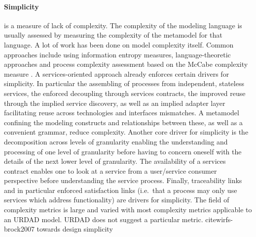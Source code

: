 \paragraph{Simplicity} is a measure of lack of complexity. The complexity of the modeling language is usually assessed by measuring the complexity of the metamodel for that language\cite{mohagheghi_evaluating_2007}. A lot of work has been done on model complexity itself. Common approaches include using information entropy measures\cite{abrahamsson_extreme_2004}, language-theoretic approaches\cite{podgorelec_estimating_2007} and process complexity assessment based on the McCabe complexity measure \cite{mccabe_complexity_1976}. A services-oriented approach already enforces certain drivers for simplicity. In particular the assembling of processes from independent, stateless services, the enforced decoupling through services contracts, the improved reuse through the implied service discovery, as well as an implied adapter layer facilitating reuse across technologies and interfaces mismatches. A metamodel confining the modeling constructs and relationships between these, as well as a convenient grammar, reduce complexity. Another core driver for simplicity is the decomposition across levels of granularity enabling the understanding and processing of one level of granularity before having to concern oneself with the details of the next lower level of granularity. The availability of a services contract enables one to look at a service from a user/service consumer perspective before understanding the service process. Finally, traceability links and in particular enforced satisfaction links (i.e.\ that a process may only use services which address functionality) are drivers for simplicity. The field of complexity metrics is large and varied with most complexity metrics applicable to an URDAD model. URDAD does not suggest a particular metric. cite{wirfs-brock2007 towards design simplicity}

